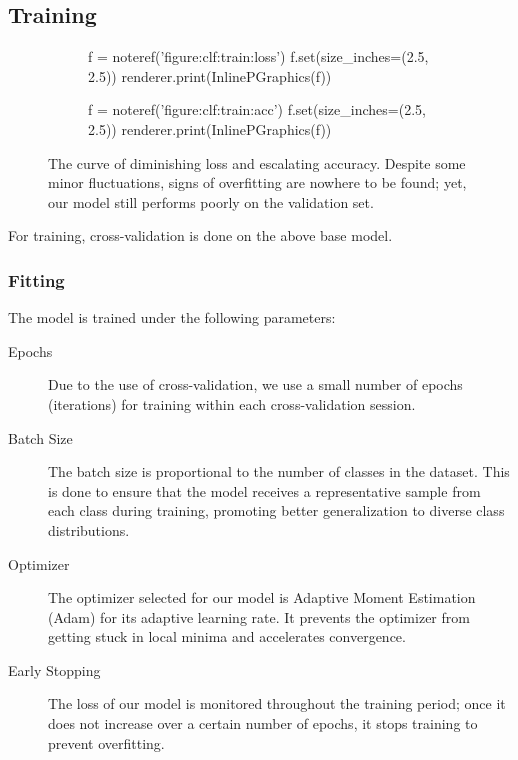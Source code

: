 \documentclass[letterpaper]{article} %
\begin{document}
\subsection{Training}
\begin{figure*}[t!]
  \centering
  \renewcommand\sffamily{}
  \begin{subfigure}[t]{.45\textwidth}
    \centering
    \begin{python}
      f = noteref('figure:clf:train:loss')
      f.set(size_inches=(2.5, 2.5))
      renderer.print(InlinePGraphics(f))
    \end{python}
  \end{subfigure}
  \begin{subfigure}[t]{.45\textwidth}
    \centering
    \begin{python}
      f = noteref('figure:clf:train:acc')
      f.set(size_inches=(2.5, 2.5))
      renderer.print(InlinePGraphics(f))
    \end{python}
  \end{subfigure}
  \caption{
    The curve of diminishing loss and escalating accuracy.
    Despite some minor fluctuations, signs of overfitting 
    are nowhere to be found; yet,
    our model still performs poorly on the validation set.
  }\label{figure:clf:train}
\end{figure*}

For training, cross-validation is done on the above base model.

\subsubsection{Fitting}
The model is trained under the following parameters:
\begin{description}
  \item[Epochs]
  Due to the use of cross-validation,
  we use a small number of epochs (iterations) for training
  within each cross-validation session.
  \item[Batch Size]
  The batch size is proportional to the number of classes in the dataset. 
  This is done to ensure that the model receives a representative sample 
  from each class during training, promoting better generalization to 
  diverse class distributions.
  \item[Optimizer]
  The optimizer selected for our model is 
  Adaptive Moment Estimation (Adam)
  for its adaptive learning rate. 
  It prevents the optimizer from getting stuck in local minima 
  and accelerates convergence.
  \item[Early Stopping]
  The loss of our model is monitored throughout
  the training period; once it does not increase
  over a certain number of epochs, it stops training
  to prevent overfitting.
\end{description}
\end{document}
